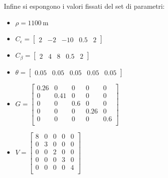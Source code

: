 Infine si espongono i valori fissati del set di parametri:
\begin{itemize}
	\item $\rho = \SI{1100}{\meter}$
	\item $C_\epsilon = \begin{bmatrix} 2 & -2 & -10 & 0.5 & 2 \end{bmatrix}$
	\item $C_\beta = \begin{bmatrix} 2 & 4 & 8 & 0.5 & 2 \end{bmatrix}$
	\item $\theta = \begin{bmatrix} 0.05 & 0.05  & 0.05 & 0.05  & 0.05  \end{bmatrix}$
	\item $G = 
	\begin{bmatrix}
		0.26 & 0 & 0 & 0 & 0 \\
		0 & 0.41 & 0 & 0 & 0 \\
		0 & 0 & 0.6 & 0 & 0 \\
		0 & 0 & 0 & 0.26 & 0 \\
		0 & 0 & 0 & 0 & 0.6 \\
	\end{bmatrix}
	$
	\item $V = 
	\begin{bmatrix}
		8 & 0 & 0 & 0 & 0 \\
		0 & 3 & 0 & 0 & 0 \\
		0 & 0 & 2 & 0 & 0 \\
		0 & 0 & 0 & 3 & 0 \\
		0 & 0 & 0 & 0 & 4 \\
	\end{bmatrix}
	$
\end{itemize}